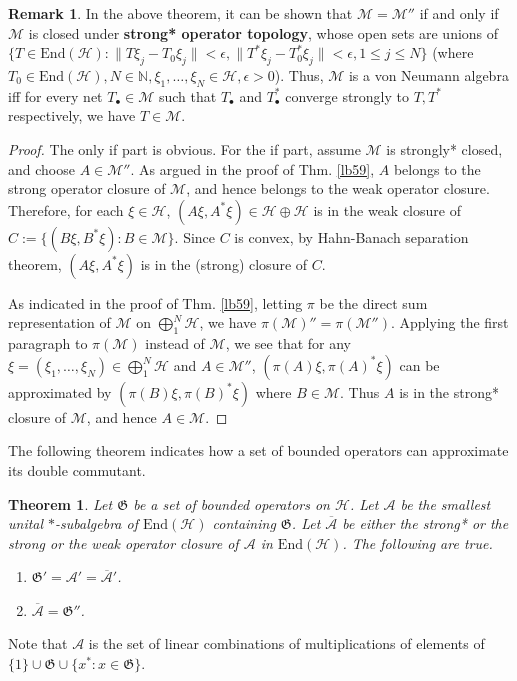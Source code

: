 \documentclass[12pt,b5paper,notitlepage]{article}
\theoremstyle{definition}
\newtheorem{rem}[df]{Remark}
\theoremstyle{plain}
\newtheorem{thm}[df]{Theorem}
\newcommand{\fk}{\mathfrak}
\newcommand{\mc}{\mathcal}
\newcommand{\ovl}{\overline}
\newcommand{\End}{\mathrm{End}} %
\newcommand{\blt}{\bullet}
\newcommand{\Nbb}{\mathbb N}
\numberwithin{equation}{section}
\begin{document}
\begin{rem}
In the above theorem, it can be shown that $\mc M=\mc M''$ if and only if $\mc M$ is closed under \textbf{strong* operator topology}, whose open sets are unions of $\{T\in\End(\mc H):\lVert T\xi_j-T_0\xi_j\lVert<\epsilon, \lVert T^*\xi_j-T_0^*\xi_j\lVert<\epsilon,1\leq j\leq N\}$ (where $T_0\in\End(\mc H),N\in\Nbb,\xi_1,\dots,\xi_N\in\mc H,\epsilon>0$). Thus, $\mc M$ is a von Neumann algebra iff for every net $T_\blt\in\mc M$ such that $T_\blt$ and $T_\blt^*$ converge strongly to $T,T^*$ respectively, we have $T\in\mc M$.
\end{rem}

\begin{proof}
The only if part is obvious. For the if part, assume $\mc M$ is strongly* closed, and choose $A\in\mc M''$. As argued in the proof of Thm. \ref{lb59}, $A$ belongs to the strong operator closure of $\mc M$, and hence belongs to the weak operator closure. Therefore, for each $\xi\in\mc H$, $(A\xi,A^*\xi)\in\mc H\oplus\mc H$ is in the weak closure of $C:=\{(B\xi,B^*\xi):B\in\mc M\}$. Since $C$ is convex, by Hahn-Banach separation theorem, $(A\xi,A^*\xi)$ is in the (strong) closure of $C$. 

As indicated in the proof of Thm. \ref{lb59}, letting $\pi$ be the direct sum representation of $\mc M$ on $\bigoplus_1^N\mc H$, we have $\pi(\mc M)''=\pi(\mc M'')$. Applying the first paragraph to $\pi(\mc M)$ instead of $\mc M$, we see that for any $\xi=(\xi_1,\dots,\xi_N)\in\bigoplus_1^N\mc H$ and $A\in\mc M''$, $(\pi(A)\xi,\pi(A)^*\xi)$ can be approximated by $(\pi(B)\xi,\pi(B)^*\xi)$ where $B\in\mc M$. Thus $A$ is in the strong* closure of $\mc M$, and hence $A\in\mc M$. 
\end{proof}









The following theorem indicates how a set of bounded operators can approximate its double commutant.

\begin{thm}\label{lb60}
Let $\fk G$ be a set of bounded operators on $\mc H$. Let $\mc A$ be the smallest unital $*$-subalgebra of $\End(\mc H)$ containing $\fk G$. Let $\ovl{\mc A}$ be either the strong* or the strong or the weak operator closure of $\mc A$ in $\End(\mc H)$. The following are true.
\begin{enumerate}
\item $\fk G'=\mc A'=\ovl{\mc A}'$.
\item $\ovl{\mc A}=\fk G''$.
\end{enumerate} 
\end{thm}
Note that $\mc A$ is the set of linear combinations of multiplications of elements of $\{1\}\cup\fk G\cup\{x^*:x\in\fk G\}$.
\end{document}
